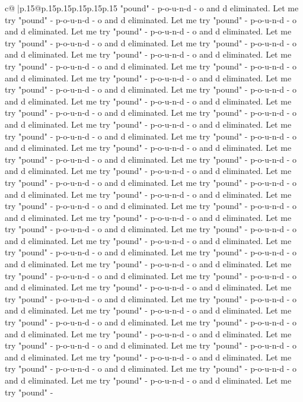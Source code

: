 \documentclass{article}
\begin{document}
{\begin{supertabular}{c@{$\;$}|p{.15\linewidth}@{}p{.15\linewidth}p{.15\linewidth}p{.15\linewidth}p{.15\linewidth}p{.15\linewidth}}
{{{"pound" {-} p{-}o{-}u{-}n{-}d {-} o and d eliminated. Let me try "pound" {-} p{-}o{-}u{-}n{-}d {-} o and d eliminated. Let me try "pound" {-} p{-}o{-}u{-}n{-}d {-} o and d eliminated. Let me try "pound" {-} p{-}o{-}u{-}n{-}d {-} o and d eliminated. Let me try "pound" {-} p{-}o{-}u{-}n{-}d {-} o and d eliminated. Let me try "pound" {-} p{-}o{-}u{-}n{-}d {-} o and d eliminated. Let me try "pound" {-} p{-}o{-}u{-}n{-}d {-} o and d eliminated. Let me try "pound" {-} p{-}o{-}u{-}n{-}d {-} o and d eliminated. Let me try "pound" {-} p{-}o{-}u{-}n{-}d {-} o and d eliminated. Let me try "pound" {-} p{-}o{-}u{-}n{-}d {-} o and d eliminated. Let me try "pound" {-} p{-}o{-}u{-}n{-}d {-} o and d eliminated. Let me try "pound" {-} p{-}o{-}u{-}n{-}d {-} o and d eliminated. Let me try "pound" {-} p{-}o{-}u{-}n{-}d {-} o and d eliminated. Let me try "pound" {-} p{-}o{-}u{-}n{-}d {-} o and d eliminated. Let me try "pound" {-} p{-}o{-}u{-}n{-}d {-} o and d eliminated. Let me try "pound" {-} p{-}o{-}u{-}n{-}d {-} o and d eliminated. Let me try "pound" {-} p{-}o{-}u{-}n{-}d {-} o and d eliminated. Let me try "pound" {-} p{-}o{-}u{-}n{-}d {-} o and d eliminated. Let me try "pound" {-} p{-}o{-}u{-}n{-}d {-} o and d eliminated. Let me try "pound" {-} p{-}o{-}u{-}n{-}d {-} o and d eliminated. Let me try "pound" {-} p{-}o{-}u{-}n{-}d {-} o and d eliminated. Let me try "pound" {-} p{-}o{-}u{-}n{-}d {-} o and d eliminated. Let me try "pound" {-} p{-}o{-}u{-}n{-}d {-} o and d eliminated. Let me try "pound" {-} p{-}o{-}u{-}n{-}d {-} o and d eliminated. Let me try "pound" {-} p{-}o{-}u{-}n{-}d {-} o and d eliminated. Let me try "pound" {-} p{-}o{-}u{-}n{-}d {-} o and d eliminated. Let me try "pound" {-} p{-}o{-}u{-}n{-}d {-} o and d eliminated. Let me try "pound" {-} p{-}o{-}u{-}n{-}d {-} o and d eliminated. Let me try "pound" {-} p{-}o{-}u{-}n{-}d {-} o and d eliminated. Let me try "pound" {-} p{-}o{-}u{-}n{-}d {-} o and d eliminated. Let me try "pound" {-} p{-}o{-}u{-}n{-}d {-} o and d eliminated. Let me try "pound" {-} p{-}o{-}u{-}n{-}d {-} o and d eliminated. Let me try "pound" {-} p{-}o{-}u{-}n{-}d {-} o and d eliminated. Let me try "pound" {-} p{-}o{-}u{-}n{-}d {-} o and d eliminated. Let me try "pound" {-} p{-}o{-}u{-}n{-}d {-} o and d eliminated. Let me try "pound" {-} p{-}o{-}u{-}n{-}d {-} o and d eliminated. Let me try "pound" {-} p{-}o{-}u{-}n{-}d {-} o and d eliminated. Let me try "pound" {-} p{-}o{-}u{-}n{-}d {-} o and d eliminated. Let me try "pound" {-} p{-}o{-}u{-}n{-}d {-} o and d eliminated. Let me try "pound" {-} p{-}o{-}u{-}n{-}d {-} o and d eliminated. Let me try "pound" {-} p{-}o{-}u{-}n{-}d {-} o and d eliminated. Let me try "pound" {-} p{-}o{-}u{-}n{-}d {-} o and d eliminated. Let me try "pound" {-} p{-}o{-}u{-}n{-}d {-} o and d eliminated. Let me try "pound" {-} p{-}o{-}u{-}n{-}d {-} o and d eliminated. Let me try "pound" {-} p{-}o{-}u{-}n{-}d {-} o and d eliminated. Let me try "pound" {-} p{-}o{-}u{-}n{-}d {-} o and d eliminated. Let me try "pound" {-} p{-}o{-}u{-}n{-}d {-} o and d eliminated. Let me try "pound" {-} p{-}o{-}u{-}n{-}d {-} o and d eliminated. Let me try "pound" {-} p{-}o{-}u{-}n{-}d {-} o and d eliminated. Let me try "pound" {-} }}}
\end{supertabular}}
\end{document}
